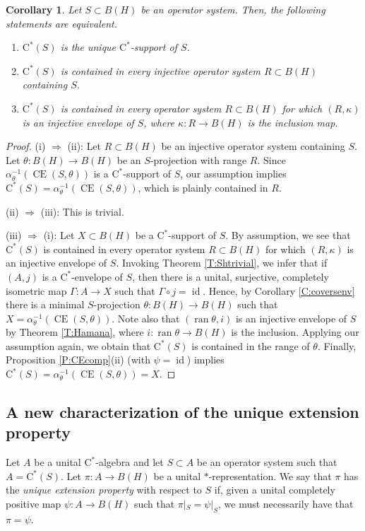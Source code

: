 \documentclass[10pt]{amsart}
\newcommand{\rC}{\mathrm{C}}
\newcommand{\CE}{\operatorname{CE}}
\newcommand{\id}{\operatorname{id}}
\newcommand{\ran}{\operatorname{ran}}
\newtheorem{corollary}[lemma]{Corollary}
\theoremstyle{definition}
\begin{document}
\begin{corollary}\label{C:uniqueCE}
Let $S\subset B(H)$  be an operator system. Then, the following statements are equivalent.
\begin{enumerate}[{\rm (i)}]
\item $\rC^*(S)$ is the unique $\rC^*$-support of $S$.
\item $\rC^*(S)$ is contained  in every injective operator system $R\subset B(H)$ containing $S$.
\item $\rC^*(S)$ is contained  in every operator system $R\subset B(H)$ for which $(R,\kappa)$ is an injective envelope of $S$, where $\kappa:R\to B(H)$ is the inclusion map.
\end{enumerate}
\end{corollary}
\begin{proof}
(i) $\Rightarrow$ (ii):  Let  $R\subset B(H)$ be an injective operator system containing $S$. Let $\theta:B(H)\to B(H)$ be an $S$-projection with range $R$. Since $\alpha_\theta^{-1}(\CE(S,\theta))$ is a $\rC^*$-support of $S$, our assumption implies $\rC^*(S)=\alpha_\theta^{-1}(\CE(S,\theta))$, which is plainly contained in $R$.

(ii) $\Rightarrow$ (iii): This is trivial.


(iii) $\Rightarrow$ (i):  Let $X\subset B(H)$ be a $\rC^*$-support of $S$. By assumption, we see that $\rC^*(S)$ is contained  in every operator system $R\subset B(H)$ for which $(R,\kappa)$ is an injective envelope of $S$.  Invoking Theorem \ref{T:Shtrivial}, we infer that if $(A,j)$ is a $\rC^*$-envelope of $S$, then there is a unital, surjective, completely isometric map $\Gamma:A\to X$ such that $\Gamma\circ j=\id$. Hence, by Corollary \ref{C:coversenv} there is a minimal $S$-projection $\theta:B(H)\to B(H)$ such that  $X=\alpha_\theta ^{-1}(\CE(S,\theta)).$ Note also that $(\ran \theta,i)$ is an injective envelope of $S$ by Theorem \ref{T:Hamana}, where $i:\ran\theta\to B(H)$ is the inclusion. Applying our assumption again, we obtain that $\rC^*(S)$ is contained in the range of $\theta$. Finally, Proposition \ref{P:CEcomp}(ii) (with $\psi=\id$) implies $\rC^*(S)=\alpha_\theta^{-1}(\CE(S,\theta))=X$.
\end{proof}



\subsection{A new characterization of the unique extension property}\label{SS:uep}
Let $A$ be a  unital $\rC^*$-algebra and let $S\subset A$ be an operator system such that $A=\rC^*(S)$. Let $\pi:A\to B(H)$ be a unital $*$-representation. We say that $\pi$ has the \emph{unique extension property} with respect to $S$ if, given a unital completely positive map $\psi:A\to B(H)$ such that $\pi|_S=\psi|_S$, we must necessarily have that $\pi=\psi$.  
\end{document}
